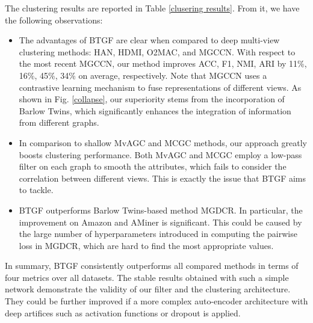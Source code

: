 \documentclass[letterpaper]{article} %
\begin{document}
The clustering results are reported in Table \ref{clusering results}. From it, we have the following observations:
\begin{itemize}
    \item The advantages of BTGF are clear when compared to deep multi-view clustering methods: HAN, HDMI, O2MAC, and MGCCN. With respect to the most recent MGCCN, our method improves ACC, F1, NMI, ARI by 11\%, 16\%, 45\%, 34\% on average, respectively. Note that MGCCN uses a contrastive learning mechanism to fuse representations of different views. %
    As shown in Fig. \ref{collapse}, our superiority stems from the incorporation of Barlow Twins, which significantly enhances the integration of information from different graphs.

    \item In comparison to shallow MvAGC and MCGC methods, our approach greatly boosts clustering performance. Both MvAGC and MCGC employ a low-pass filter on each graph to smooth the attributes, which fails to consider the correlation between different views. This is exactly the issue that BTGF aims to tackle. %
    
    \item BTGF outperforms Barlow Twins-based method MGDCR. In particular, the improvement on Amazon and AMiner is significant. This could be caused by the large number of hyperparameters introduced in computing the pairwise loss in MGDCR, which are hard to find the most appropriate values.%
\end{itemize}
In summary, BTGF consistently outperforms all compared methods in terms of four metrics over all datasets. The stable results obtained with such a simple network demonstrate the validity of our filter and the clustering architecture.
They could be further improved if a more complex auto-encoder architecture with deep artifices such as activation functions or dropout is applied. 
\end{document}
